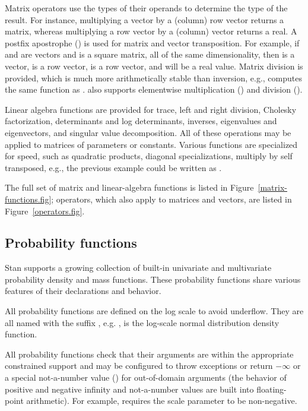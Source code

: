 \documentclass[article]{jss}
\begin{document}
Matrix operators use the types of their operands to determine the type
of the result.  For instance, multiplying a vector by a (column) row
vector returns a matrix, whereas multiplying a row vector by a
(column) vector returns a real.  A postfix apostrophe () is
used for matrix and vector transposition.  For example, if 
and  are vectors and  is a square matrix, all of
the same dimensionality, then  is a vector,  is a row vector,  is a row vector, and
 will be a real value.  Matrix
division is provided, which is much more arithmetically stable than
inversion, e.g.,  computes the same function
as .   also supports
elementwise multiplication () and division ().

Linear algebra functions are provided for trace, left and right
division, Cholesky factorization, determinants and log determinants,
inverses, eigenvalues and eigenvectors, and singular value
decomposition.  All of these operations may be applied to matrices of
parameters or constants.  Various functions are specialized for speed,
such as quadratic products, diagonal specializations, multiply by self
transposed, e.g., the previous example could be written as
.

The full set of matrix and linear-algebra functions is listed in
Figure~\ref{matrix-functions.fig}; operators, which also apply to
matrices and vectors, are listed in Figure~\ref{operators.fig}.

\subsection{Probability functions}

Stan supports a growing collection of built-in univariate and
multivariate probability density and mass functions.  These
probability functions share various features of their declarations and
behavior.

All probability functions are defined on the log scale to avoid
underflow.  They are all named with the suffix , e.g.
, is the log-scale normal distribution density
function.

All probability functions check that their arguments are within the
appropriate constrained support and may be configured to throw
exceptions or return $-\infty$ or a special not-a-number value
() for out-of-domain arguments (the behavior of positive and
negative infinity and not-a-number values are built into
floating-point arithmetic).  For example,
   requires the scale parameter
 to be non-negative.
\end{document}
